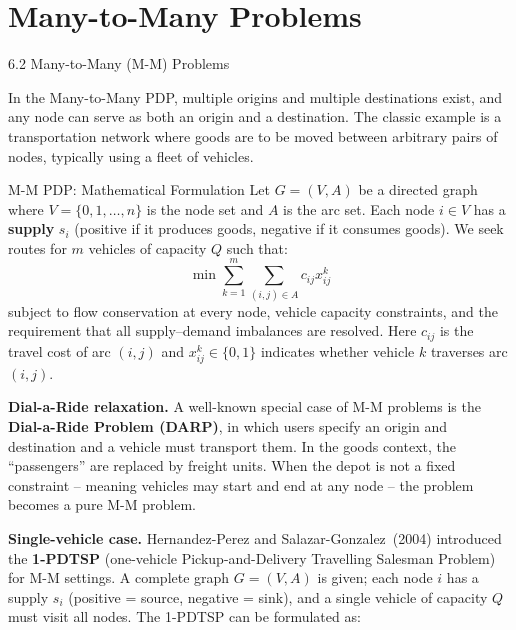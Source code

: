 \documentclass[aspectratio=169,10pt]{beamer}
\begin{document}
\section{Many-to-Many Problems}

\begin{frame}[allowframebreaks]{6.2 Many-to-Many (M-M) Problems}

  In the Many-to-Many PDP, multiple origins and multiple destinations exist, and any node
  can serve as both an origin and a destination. The classic example is a transportation
  network where goods are to be moved between arbitrary pairs of nodes, typically using
  a fleet of vehicles.

  \begin{block}{M-M PDP: Mathematical Formulation}
    Let $G = (V, A)$ be a directed graph where $V = \{0, 1, \ldots, n\}$ is the node set
    and $A$ is the arc set.  Each node $i \in V$ has a \textbf{supply} $s_i$ (positive if
    it produces goods, negative if it consumes goods).  We seek routes for $m$ vehicles
    of capacity $Q$ such that:
    \[
      \min \sum_{k=1}^{m} \sum_{(i,j) \in A} c_{ij} x_{ij}^k
    \]
    subject to flow conservation at every node, vehicle capacity constraints, and the
    requirement that all supply--demand imbalances are resolved.  Here $c_{ij}$ is the
    travel cost of arc $(i,j)$ and $x_{ij}^k \in \{0,1\}$ indicates whether vehicle $k$
    traverses arc $(i,j)$.
  \end{block}

  \textbf{Dial-a-Ride relaxation.} A well-known special case of M-M problems is the
  \textbf{Dial-a-Ride Problem (DARP)}, in which users specify an origin and destination
  and a vehicle must transport them. In the goods context, the ``passengers'' are replaced
  by freight units. When the depot is not a fixed constraint -- meaning vehicles may start
  and end at any node -- the problem becomes a pure M-M problem.

  \framebreak

  \textbf{Single-vehicle case.} Hernandez-Perez and Salazar-Gonzalez~(2004) introduced
  the \textbf{1-PDTSP} (one-vehicle Pickup-and-Delivery Travelling Salesman Problem) for
  M-M settings.  A complete graph $G = (V, A)$ is given; each node $i$ has a supply
  $s_i$ (positive = source, negative = sink), and a single vehicle of capacity $Q$
  must visit all nodes.  The 1-PDTSP can be formulated as:


\end{frame}
\end{document}
